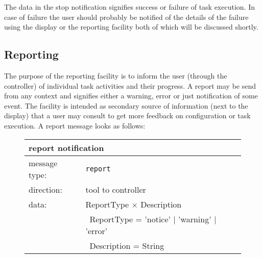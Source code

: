 \documentclass{article}
\newcommand{\msg}[1]{\texttt{#1}}
\begin{document}
   \noindent The data in the stop notification signifies success or failure
   of task execution. In case of failure the user should probably be notified
   of the details of the failure using the display or the reporting facility
   both of which will be discussed shortly.
   

  \subsection{Reporting}

   The purpose of the reporting facility is to inform the user (through the
   controller) of individual task activities and their progress. A report may
   be send from any context and signifies either a warning, error or just
   notification of some event. The facility is intended as secondary source of
   information (next to the display) that a user may consult to get more
   feedback on configuration or task execution. A report message looks as follows:
   
   \begin{figure}[H]
    \begin{center}
     \begin{tabular}{|ll|}
      \hline
       \multicolumn{2}{|l|}{\textbf{report notification}} \\
      \hline
       message type:   & \msg{report} \\
      \hline
       direction:      & tool to controller \\
       data:           & ReportType $\times$ Description \\
                       & \ ReportType = 'notice' $|$ 'warning' $|$ 'error' \\
                       & \ Description = String \\
      \hline
     \end{tabular}
    \end{center}
   \end{figure}
   \vspace{-0.3cm}
\end{document}
